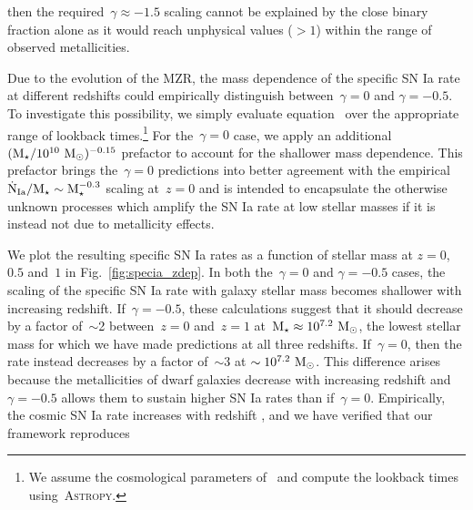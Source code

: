\documentclass[ms.tex]{subfiles}
\begin{document}
then the required~$\gamma \approx -1.5$ scaling cannot be explained by the
close binary fraction alone as it would reach unphysical values ($>1$) within
the range of observed metallicities.
\par
Due to the evolution of the MZR, the mass dependence of the specific SN Ia rate
at different redshifts could empirically distinguish between~$\gamma = 0$ and
$\gamma = -0.5$.
To investigate this possibility, we simply evaluate equation~
over the appropriate range of lookback times.\footnote{
	We assume the cosmological parameters of~\citet{Planck2014} and compute the
	lookback times using~\textsc{Astropy}.
}
For the~$\gamma = 0$ case, we apply an additional
$(\text{M}_\star / 10^{10}~\text{M}_\odot)^{-0.15}$ prefactor to account for the shallower mass
dependence.
This prefactor brings the~$\gamma = 0$ predictions into better agreement with
the empirical~$\dot{\text{N}}_\text{Ia} / \text{M}_\star \sim \text{M}_\star^{-0.3}$ scaling
at~$z = 0$ and is intended to encapsulate the otherwise unknown processes which
amplify the SN Ia rate at low stellar masses if it is instead not due to
metallicity effects.
\par
We plot the resulting specific SN Ia rates as a function of stellar mass at
$z = 0$,~$0.5$ and~$1$ in Fig.~\ref{fig:specia_zdep}.
In both the~$\gamma = 0$ and $\gamma = -0.5$ cases, the scaling of the specific
SN Ia rate with galaxy stellar mass becomes shallower with increasing redshift.
If~$\gamma = -0.5$, these calculations suggest that it should decrease by a
factor of~$\sim$2 between~$z = 0$ and~$z = 1$ at~$\text{M}_\star \approx
10^{7.2}~\text{M}_\odot$, the lowest stellar mass for which we have made predictions at
all three redshifts.
If~$\gamma = 0$, then the rate instead decreases by a factor of~$\sim$3 at
$\sim 10^{7.2}~\text{M}_\odot$.
This difference arises because the metallicities of dwarf galaxies decrease
with increasing redshift and~$\gamma = -0.5$ allows them to sustain higher
SN Ia rates than if~$\gamma = 0$.
Empirically, the cosmic SN Ia rate increases with redshift
\citep[e.g.][]{Graur2014}, and we have verified that our framework reproduces
\end{document}
